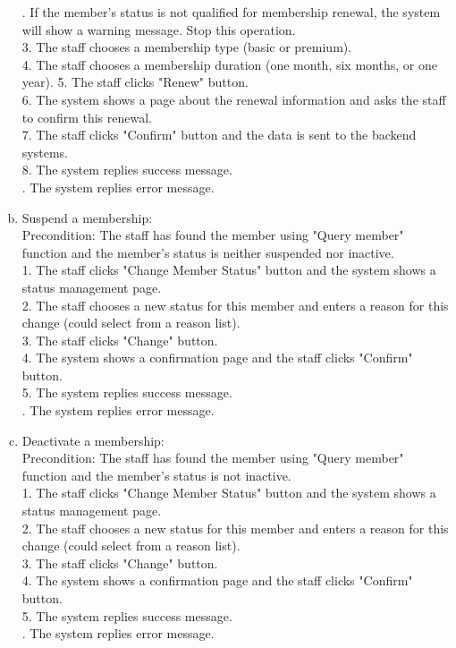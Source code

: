 \documentclass[11pt]{article}
\begin{document}
\begin{enumerate}[(a)]
. If the member's status is not qualified for membership renewal, the system will show a warning message. Stop this operation.\\
3. The staff chooses a membership type (basic or premium).\\
4. The staff chooses a membership duration (one month, six months, or one year).
5. The staff clicks "Renew" button.\\
6. The system shows a page about the renewal information and asks the staff to confirm this renewal.\\
7. The staff clicks "Confirm" button and the data is sent to the backend systems.\\
8. The system replies success message.\\
. The system replies error message.
\item Suspend a membership:\\
Precondition: The staff has found the member using "Query member" function and the member's status is neither suspended nor inactive.\\
1. The staff clicks "Change Member Status" button and the system shows a status management page.\\
2. The staff chooses a new status for this member and enters a reason for this change (could select from a reason list).\\
3. The staff clicks "Change" button.\\
4. The system shows a confirmation page and the staff clicks "Confirm" button.\\
5. The system replies success message.\\
. The system replies error message.
\item Deactivate a membership:\\
Precondition: The staff has found the member using "Query member" function and the member's status is not inactive.\\
1. The staff clicks "Change Member Status" button and the system shows a status management page.\\
2. The staff chooses a new status for this member and enters a reason for this change (could select from a reason list).\\
3. The staff clicks "Change" button.\\
4. The system shows a confirmation page and the staff clicks "Confirm" button.\\
5. The system replies success message.\\
. The system replies error message.

\end{enumerate}
\end{document}
